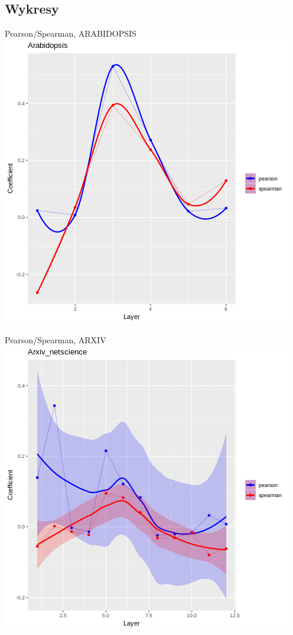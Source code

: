 \documentclass{beamer}
\begin{document}
\subsection{Wykresy}
\begin{frame}{Pearson/Spearman, ARABIDOPSIS} 
\includegraphics[scale=0.5]{plot1}
\end{frame}
\begin{frame}{Pearson/Spearman, ARXIV} 
\includegraphics[scale=0.5]{plot2}
\end{frame}
\end{document}
